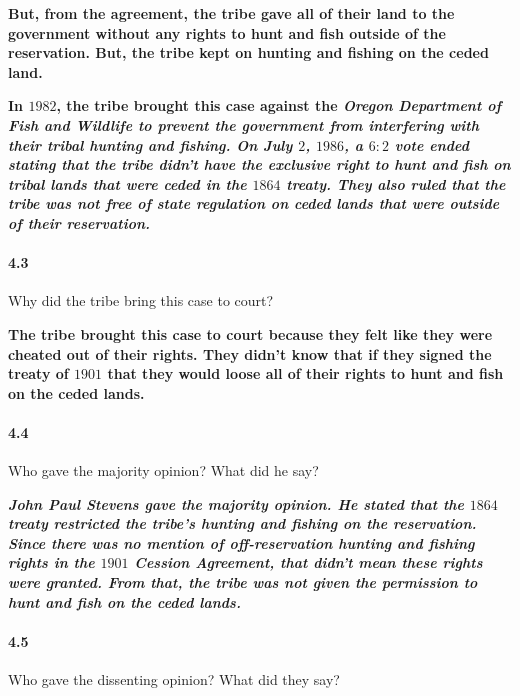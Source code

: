 \bf{But, from the agreement, the tribe gave all of their land to the government
    without any rights to hunt and fish outside of the reservation. But, the
    tribe kept on hunting and fishing on the ceded land.}

\bf{In $1982$, the tribe brought this case against the \it{Oregon Department of
    Fish and Wildlife} to prevent the government from interfering with their
    tribal hunting and fishing. On \it{July $2$, $1986$}, a $6:2$ vote ended
    stating that the tribe didn't have the exclusive right to hunt and fish on
    tribal lands that were ceded in the $1864$ treaty. They also ruled that the
    tribe was not free of state regulation on ceded lands that were outside of
    their reservation.}


\paragraph{4.3} Why did the tribe bring this case to court?

\bf{The tribe brought this case to court because they felt like they were
    cheated out of their rights. They didn't know that if they signed the treaty of
    $1901$ that they would loose all of their rights to hunt and fish on the ceded
    lands.}


\paragraph{4.4} Who gave the majority opinion? What did he say?

\bf{\it{John Paul Stevens} gave the majority opinion.
    He stated that the $1864$ treaty restricted the tribe's hunting and fishing
    on the reservation. Since there was no mention of off-reservation hunting
    and fishing rights in the $1901$ Cession Agreement, that didn't mean these
    rights were granted. From that, the tribe was not given the permission to hunt
    and fish on the ceded lands.}


\paragraph{4.5} Who gave the dissenting opinion? What did they say?

